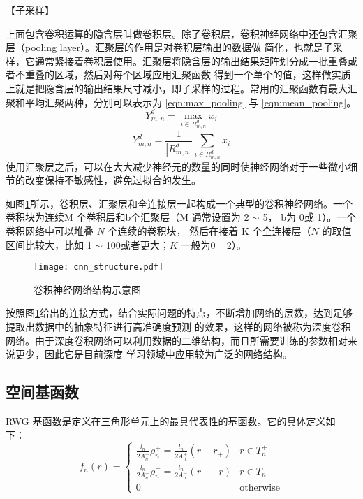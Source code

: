 【子采样】

上面包含卷积运算的隐含层叫做卷积层。除了卷积层，卷积神经网络中还包含汇聚层（pooling layer）。汇聚层的作用是对卷积层输出的数据做
简化，也就是子采样，它通常紧接着卷积层使用。汇聚层将隐含层的输出结果矩阵划分成一批重叠或者不重叠的区域，然后对每个区域应用汇聚函数
得到一个单个的值，这样做实质上就是把隐含层的输出结果尺寸减小，即子采样的过程。常用的汇聚函数有最大汇聚和平均汇聚两种，分别可以表示为
\ref{eqn:max_pooling} 与 \ref{eqn:mean_pooling}。
\begin{equation}
\label{eqn:max_pooling} 
Y_{m, n}^{d}=\max _{i \in R_{m, n}^{d}} x_{i}
\end{equation}
\begin{equation} 
\label{eqn:mean_pooling}
Y_{m, n}^{d}=\frac{1}{\left|R_{m, n}^{d}\right|} \sum_{i \in R_{m, n}^{d}} x_{i}
\end{equation}
使用汇聚层之后，可以在大大减少神经元的数量的同时使神经网络对于一些微小细节的改变保持不敏感性，避免过拟合的发生。

如图\ref{cnn_structure}所示，卷积层、汇聚层和全连接层一起构成一个典型的卷积神经网络。一个卷积块为连续M 个卷积层和b个汇聚层（M
通常设置为 2 $\sim$ 5， b为 0或 1）。一个卷积网络中可以堆叠 $N$ 个连续的卷积块，
然后在接着 K 个全连接层（$N$ 的取值区间比较大，比如 1 $\sim$ 100或者更大；$K$
一般为0 ~ 2）。
\begin{figure}[h]
	\texttt{[image: cnn\_structure.pdf]}
	\caption{卷积神经网络结构示意图}
	\label{cnn_structure}
\end{figure}

按照图\ref{cnn_structure}给出的连接方式，结合实际问题的特点，不断增加网络的层数，达到足够提取出数据中的抽象特征进行高准确度预测
的效果，这样的网络被称为深度卷积网络。由于深度卷积网络可以利用数据的二维结构，而且所需要训练的参数相对来说更少，因此它是目前深度
学习领域中应用较为广泛的网络结构。



\subsection{空间基函数}
RWG 基函数是定义在三角形单元上的最具代表性的基函数。它的具体定义如
下：
\begin{equation}
f_n(r)=
\begin{cases}
\frac{l_n}{2A_n^+}\rho_n^+=\frac{l_n}{2A_n^+}(r-r_+)&r\in T_n^+\\
\frac{l_n}{2A_n^-}\rho_n^-=\frac{l_n}{2A_n^-}(r_--r)&r\in T_n^-\\
0&\text{otherwise}
\end{cases}
\end{equation}

